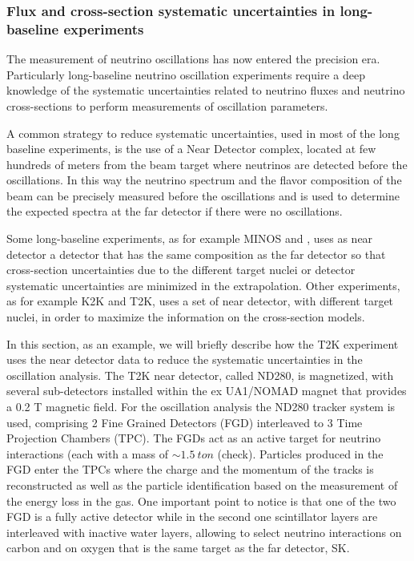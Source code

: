 \subsubsection{Flux and cross-section systematic uncertainties in long-baseline experiments}
\label{sec:beamsyst}
The measurement of neutrino oscillations has now entered the precision era. Particularly long-baseline neutrino oscillation experiments require a deep knowledge of the systematic uncertainties related to neutrino fluxes and neutrino cross-sections to perform measurements of oscillation parameters. 

A common strategy to reduce systematic uncertainties, used in most of the long baseline experiments, is the use of a Near Detector complex, located at few hundreds of meters from the beam target where neutrinos are detected before the oscillations. In this way the neutrino spectrum and the flavor composition of the beam can be precisely measured before the oscillations and is used to determine the expected spectra at the far detector if there were no oscillations.

Some long-baseline experiments, as for example MINOS and \nova, uses as near detector a detector that has the same composition as the far detector so that cross-section uncertainties due to the different target nuclei or detector systematic uncertainties are minimized in the extrapolation. Other experiments, as for example K2K and T2K, uses a set of near detector, with different target nuclei, in order to maximize the information on the cross-section models.

In this section, as an example, we will briefly describe how the T2K experiment uses the near detector data to reduce the systematic uncertainties in the oscillation analysis. The T2K near detector, called ND280, is magnetized, with several sub-detectors installed within the ex UA1/NOMAD magnet that provides a 0.2 T magnetic field. For the oscillation analysis the ND280 tracker system is used, comprising 2 Fine Grained Detectors (FGD) interleaved to 3 Time Projection Chambers (TPC). The FGDs act as an active target for neutrino interactions (each with a mass of $\sim1.5~ton$ (check). Particles produced in the FGD enter the TPCs where the charge and the momentum of the tracks is reconstructed as well as the particle identification based on the measurement of the energy loss in the gas. One important point to notice is that one of the two FGD is a fully active detector while in the second one scintillator layers are interleaved with inactive water layers, allowing to select neutrino interactions on carbon and on oxygen that is the same target as the far detector, SK. 
    
